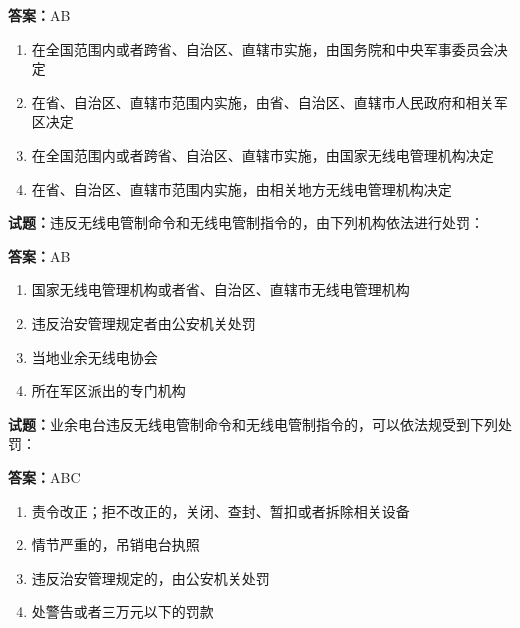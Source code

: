 \documentclass{ctexbook}
\begin{document}
\textbf{答案：}AB 

\begin{enumerate}[leftmargin=3em]
  \item 在全国范围内或者跨省、自治区、直辖市实施，由国务院和中央军事委员会决定 

  \item 在省、自治区、直辖市范围内实施，由省、自治区、直辖市人民政府和相关军区决定 

  \item 在全国范围内或者跨省、自治区、直辖市实施，由国家无线电管理机构决定 

  \item 在省、自治区、直辖市范围内实施，由相关地方无线电管理机构决定 

\end{enumerate}






\vspace{1em}

\textbf{试题：}违反无线电管制命令和无线电管制指令的，由下列机构依法进行处罚： 

\textbf{答案：}AB 

\begin{enumerate}[leftmargin=3em]
  \item 国家无线电管理机构或者省、自治区、直辖市无线电管理机构 

  \item 违反治安管理规定者由公安机关处罚 

  \item 当地业余无线电协会 

  \item 所在军区派出的专门机构 

\end{enumerate}





\vspace{1em}

\textbf{试题：}业余电台违反无线电管制命令和无线电管制指令的，可以依法规受到下列处罚： 

\textbf{答案：}ABC 

\begin{enumerate}[leftmargin=3em]
  \item 责令改正；拒不改正的，关闭、查封、暂扣或者拆除相关设备 

  \item 情节严重的，吊销电台执照 

  \item 违反治安管理规定的，由公安机关处罚 

  \item 处警告或者三万元以下的罚款 

\end{enumerate}
\end{document}
